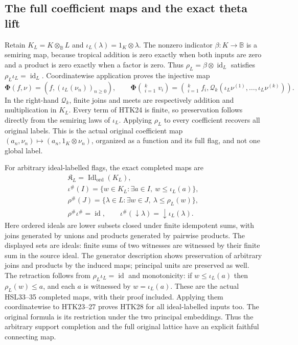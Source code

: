 \subsection{The full coefficient maps and the exact theta lift}

Retain $K_L=K\otimes_{\mathbb B}L$ and
$\iota_L(\lambda)=1_K\otimes\lambda$. The nonzero indicator
$\beta:K\to\mathbb B$ is a semiring map, because tropical
addition is zero exactly when both inputs are zero and
a product is zero exactly when a factor is zero. Thus
$\rho_L=\beta\otimes\operatorname{id}_L$ satisfies
$\rho_L\iota_L=\operatorname{id}_L$.
Coordinatewise application proves the injective map
\begin{equation}\tag{HTK28}
 \boldsymbol\Phi(f,\nu)
     =(f,(\iota_L(\nu_n))_{n\ge0}),\qquad
 \boldsymbol\Phi\left(\mathop{\star_t}_{i=1}^kv_i\right)
 =\left(\mathop{\star_t}_{i=1}^kf_i,
             \mathscr Q_k(\iota_L\nu^{(1)},\ldots,
                                           \iota_L\nu^{(k)})\right).
\end{equation}
In the right-hand $\mathscr Q_k$, finite joins and meets are
respectively addition and multiplication in $K_L$. Every
term of HTK24 is finite, so preservation follows directly
from the semiring laws of $\iota_L$. Applying $\rho_L$ to
every coefficient recovers all original labels. This is
the actual original coefficient map
$(a_n,\nu_n)\mapsto(a_n,1_K\otimes\nu_n)$, organized as a
function and its full flag, and not one global label.

For arbitrary ideal-labelled flags, the exact completed maps
are
\begin{equation}\tag{HTK29}
\begin{gathered}
 \mathfrak K_L=\operatorname{Idl}_{\mathrm{ord}}(K_L),\\
 \iota^\#(I)=\{w\in K_L:\exists a\in I,\ w\le\iota_L(a)\},\\
 \rho^\#(J)=\{\lambda\in L:\exists w\in J,
                                      \ \lambda\le\rho_L(w)\},\\
 \rho^\#\iota^\#=\operatorname{id},\qquad
 \iota^\#(\downarrow\lambda)=\downarrow\iota_L(\lambda).
\end{gathered}
\end{equation}
Here ordered ideals are lower subsets closed under finite
idempotent sums, with joins generated by unions and products
generated by pairwise products. The displayed sets are
ideals: finite sums of two witnesses are witnessed by
their finite sum in the source ideal. The generator
description shows preservation of arbitrary joins and
products by the induced maps; principal units are
preserved as well. The retraction follows from
$\rho_L\iota_L=\operatorname{id}$ and monotonicity:
if $w\le\iota_L(a)$ then $\rho_L(w)\le a$, and each
$a$ is witnessed by $w=\iota_L(a)$. These are the actual
HSL33--35 completed maps, with their proof included.
Applying them coordinatewise to HTK23--27 proves HTK28
for all ideal-labelled inputs too. The original formula
is its restriction under the two principal embeddings.
Thus the arbitrary support completion and the full original
lattice have an explicit faithful connecting map.


